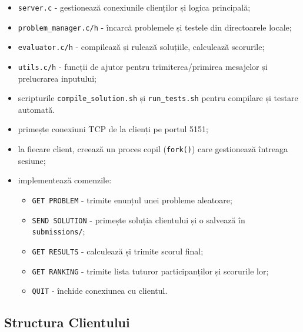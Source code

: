 \documentclass[runningheads]{llncs}
\begin{document}
\begin{description}[noitemsep, topsep=0pt]
    \item[Fișiere:] 
    \begin{itemize}[noitemsep, topsep=0pt]
        \item \texttt{server.c} - gestionează conexiunile clienților și logica principală;
        \item \texttt{problem\_manager.c/h} - încarcă problemele și testele din directoarele locale;
        \item \texttt{evaluator.c/h} - compilează și rulează soluțiile, calculează scorurile;
        \item \texttt{utils.c/h} - funcții de ajutor pentru trimiterea/primirea mesajelor și prelucrarea inputului;
        \item scripturile \texttt{compile\_solution.sh} și \texttt{run\_tests.sh} pentru compilare și testare automată.
    \end{itemize}
    \item[Funcționalitate:]
    \begin{itemize}[noitemsep, topsep=0pt]
        \item primește conexiuni TCP de la clienți pe portul 5151;
        \item la fiecare client, creează un proces copil (\texttt{fork()}) care gestionează întreaga sesiune;
        \item implementează comenzile: 
        \begin{itemize}[noitemsep, topsep=0pt]
            \item \texttt{GET PROBLEM} - trimite enunțul unei probleme aleatoare;
            \item \texttt{SEND SOLUTION} - primește soluția clientului și o salvează în \texttt{submissions/};
            \item \texttt{GET RESULTS} - calculează și trimite scorul final;
            \item \texttt{GET RANKING} - trimite lista tuturor participanților și scorurile lor;
            \item \texttt{QUIT} - închide conexiunea cu clientul.
        \end{itemize}
    \end{itemize}
\end{description}

\subsection{Structura Clientului}
\end{document}
